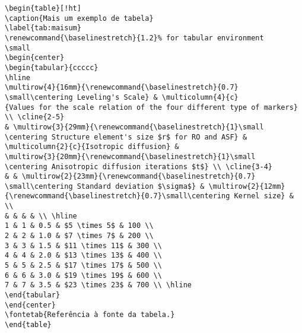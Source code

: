 \begin{verbatim}
\begin{table}[!ht]
\caption{Mais um exemplo de tabela}
\label{tab:maisum}
\renewcommand{\baselinestretch}{1.2}% for tabular environment
\small
\begin{center}
\begin{tabular}{ccccc}
\hline
\multirow{4}{16mm}{\renewcommand{\baselinestretch}{0.7}
\small\centering Leveling's Scale} & \multicolumn{4}{c}
{Values for the scale relation of the four different type of markers} 
\\ \cline{2-5}
& \multirow{3}{29mm}{\renewcommand{\baselinestretch}{1}\small
\centering Structure element's size $r$ for RO and ASF} & 
\multicolumn{2}{c}{Isotropic diffusion} & 
\multirow{3}{20mm}{\renewcommand{\baselinestretch}{1}\small
\centering Anisotropic diffusion iterations $t$} \\ \cline{3-4}
& & \multirow{2}{23mm}{\renewcommand{\baselinestretch}{0.7}
\small\centering Standard deviation $\sigma$} & \multirow{2}{12mm}
{\renewcommand{\baselinestretch}{0.7}\small\centering Kernel size} & \\
& & & & \\ \hline
1 & 1 & 0.5 & $5 \times 5$ & 100 \\
2 & 2 & 1.0 & $7 \times 7$ & 200 \\
3 & 3 & 1.5 & $11 \times 11$ & 300 \\
4 & 4 & 2.0 & $13 \times 13$ & 400 \\
5 & 5 & 2.5 & $17 \times 17$ & 500 \\
6 & 6 & 3.0 & $19 \times 19$ & 600 \\
7 & 7 & 3.5 & $23 \times 23$ & 700 \\ \hline
\end{tabular}
\end{center}
\fontetab{Referência à fonte da tabela.}
\end{table} 
\end{verbatim}

